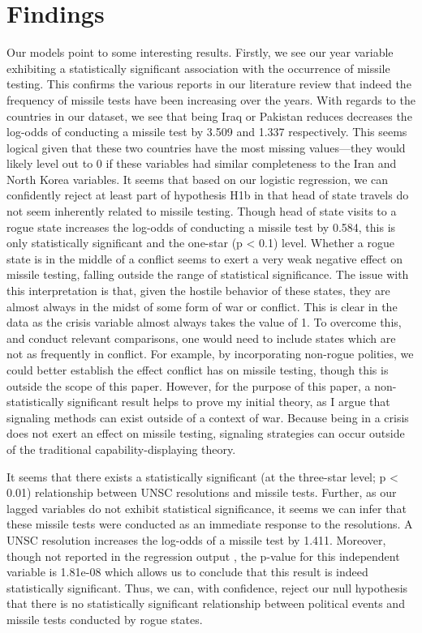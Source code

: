 \documentclass[12pt]{article}
\begin{document}
\section{Findings}
Our models point to some interesting results. Firstly, we see our year variable exhibiting a statistically significant association with the occurrence of missile testing. This confirms the various reports in our literature review that indeed the frequency of missile tests have been increasing over the years. With regards to the countries in our dataset, we see that being Iraq or Pakistan reduces decreases the log-odds of conducting a missile test by 3.509 and 1.337 respectively. This seems logical given that these two countries have the most missing values—they would likely level out to 0 if these variables had similar completeness to the Iran and North Korea variables. It seems that based on our logistic regression, we can confidently reject at least part of hypothesis H1b in that head of state travels do not seem inherently related to missile testing. Though head of state visits to a rogue state increases the log-odds of conducting a missile test by 0.584, this is only statistically significant and the one-star (p < 0.1) level. Whether a rogue state is in the middle of a conflict seems to exert a very weak negative effect on missile testing, falling outside the range of statistical significance. The issue with this interpretation is that, given the hostile behavior of these states, they are almost always in the midst of some form of war or conflict. This is clear in the data as the crisis variable almost always takes the value of 1. To overcome this, and conduct relevant comparisons, one would need to include states which are not as frequently in conflict. For example, by incorporating non-rogue polities, we could better establish the effect conflict has on missile testing, though this is outside the scope of this paper. However, for the purpose of this paper, a non-statistically significant result helps to prove my initial theory, as I argue that signaling methods can exist outside of a context of war. Because being in a crisis does not exert an effect on missile testing, signaling strategies can occur outside of the traditional capability-displaying theory. 

It seems that there exists a statistically significant (at the three-star level; p < 0.01) relationship between UNSC resolutions and missile tests. Further, as our lagged variables do not exhibit statistical significance, it seems we can infer that these missile tests were conducted as an immediate response to the resolutions. A UNSC resolution increases the log-odds of a missile test by 1.411. Moreover, though not reported in the regression output , the p-value for this independent variable is 1.81e-08 which allows us to conclude that this result is indeed statistically significant. Thus, we can, with confidence, reject our null hypothesis that there is no statistically significant relationship between political events and missile tests conducted by rogue states.  
\end{document}
